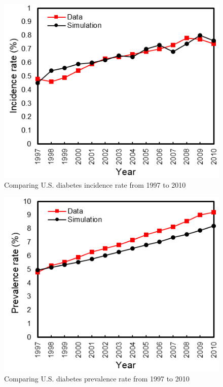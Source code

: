 \documentclass[fleqn,10pt]{wlscirep}
\begin{document}
\begin{figure}[ht]
\centering
\includegraphics[width=\linewidth]{Fig2-incidence.png}
\caption{Comparing U.S. diabetes incidence rate from 1997 to 2010}
\label{fig:inc}
\end{figure}

\begin{figure}[ht]
\centering
\includegraphics[width=\linewidth]{Fig3-prevalence.png}
\caption{Comparing U.S. diabetes prevalence rate from 1997 to 2010}
\label{fig:pre}
\end{figure}
\end{document}
